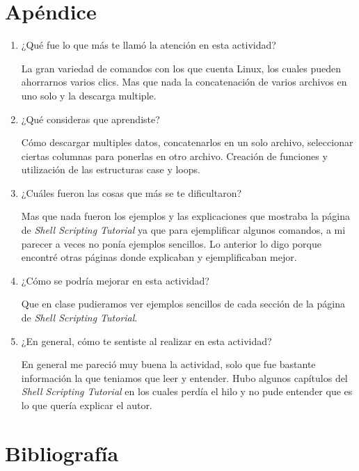 \documentclass[a4paper]{article}
\begin{document}
\section{Apéndice}


\begin{enumerate}

\item ¿Qué fue lo que más te llamó la atención en esta actividad?

La gran variedad de comandos con los que cuenta Linux, los cuales pueden ahorrarnos varios clics. Mas que nada la concatenación de varios archivos en uno solo y la descarga multiple.

\item ¿Qué consideras que aprendiste?

Cómo descargar multiples datos, concatenarlos en un solo archivo, seleccionar ciertas columnas para ponerlas en otro archivo. Creación de funciones y utilización de las estructuras case y loops.

\item ¿Cuáles fueron las cosas que más se te dificultaron?

Mas que nada fueron los ejemplos y las explicaciones que mostraba la página de \textit{Shell Scripting Tutorial} ya que para ejemplificar algunos comandos, a mi parecer a veces no ponía ejemplos sencillos. Lo anterior lo digo porque encontré otras páginas donde explicaban y ejemplificaban mejor. 

\item ¿Cómo se podría mejorar en esta actividad?

Que en clase pudieramos ver ejemplos sencillos de cada sección de la página de \textit{Shell Scripting Tutorial}. 

\item ¿En general, cómo te sentiste al realizar en esta actividad?

En general me pareció muy buena la actividad, solo que fue bastante información la que teniamos que leer y entender. Hubo algunos capítulos del \textit{Shell Scripting Tutorial} en los cuales perdía el hilo y no pude entender que es lo que quería explicar el autor.

\end{enumerate}


\section{Bibliografía}
\end{document}
